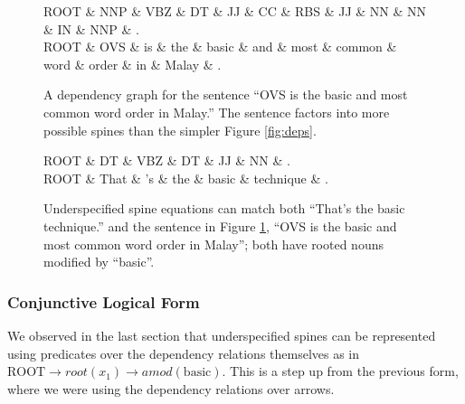 \documentclass[twoside]{article}
\begin{document}
\begin{figure}
\centering
\caption{A dependency graph for the sentence ``OVS is the basic and most common word order in Malay.'' The sentence factors into more possible spines than the simpler Figure \ref{fig:deps}.} \label{fig:spine1}
\begin{dependency}\begin{deptext}[column sep=0.2cm]ROOT \& NNP \& VBZ \& DT \& JJ \& CC \& RBS \& JJ \& NN \& NN \& IN \& NNP \& .\\ROOT \& OVS \& is \& the \& basic \& and \& most \& common \& word \& order \& in \& Malay \& .\\\end{deptext}\end{dependency}
\end{figure}

\begin{figure}
\centering
\caption{Underspecified spine equations can match both ``That's the basic technique.'' and the sentence in Figure \ref{fig:spine1}, ``OVS is the basic and most common word order in Malay''; both have rooted nouns modified by ``basic''.} \label{fig:spine2}
\begin{dependency}[edge horizontal padding=10pt]\begin{deptext}[column sep=0.3cm]ROOT \& DT \& VBZ \& DT \& JJ \& NN \& .\\ROOT \& That \& 's \& the \& basic \& technique \& .\\\end{deptext}\end{dependency}
\end{figure}

\subsubsection{Conjunctive Logical Form}

We observed in the last section that underspecified spines can be represented using predicates over the dependency relations themselves as in $\text{ROOT}\rightarrow root(x_1) \rightarrow amod ( \text{basic} )$.  This is a step up from the previous form, where we were using the dependency relations over arrows.
\end{document}
